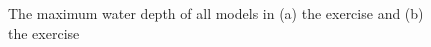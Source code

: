 \documentclass{isprs}
\begin{document}
\begin{figure}
\begin{center}
\caption{The maximum water depth of all models in (a) the  exercise and (b) the  exercise}
\label{fig:max_depth}
\end{center}
\end{figure}
%
\end{document}
